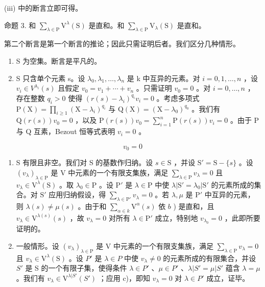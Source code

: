 (iii) 中的断言立即可得。

命题 3. 和 \(\sum_{\lambda \in \mathrm{P}}\mathrm{V}^{\lambda}(\mathrm{S})\) 是直和。和 \(\sum_{\lambda \in \mathrm{P}}\mathrm{V}_{\lambda}(\mathrm{S})\) 是直和。

第二个断言是第一个断言的推论；因此只需证明后者。我们区分几种情形。

\begin{enumerate}
\def\labelenumi{\alph{enumi})}
\item
  S 为空集。断言是平凡的。
\item
  S 只含单个元素 s。设 \(\lambda_{0}, \lambda_{1}, \ldots, \lambda_{n}\) 是 k 中互异的元素。对 \(i = 0, 1, \ldots, n\) ，设 \(v_{i} \in V^{\lambda_{i}}(s)\) 且假定 \(v_{0} = v_{1} + \cdots + v_{n}\) 。只需证明 \(v_{0} = 0\) 。对 \(i = 0, \ldots, n\) ，存在整数 \(q_{i} > 0\) 使得 \((r(s) - \lambda_{i})^{q_{i}} v_{i} = 0\) 。考虑多项式 \(\mathrm{P}(\mathrm{X}) = \prod_{i \geq 1} (\mathrm{X} - \lambda_{i})^{q_{i}}\) 与 \(\mathrm{Q}(\mathrm{X}) = (\mathrm{X} - \lambda_{0})^{q_{0}}\) 。我们有 \(\mathrm{Q}(r(s)) v_{0} = 0\) ，以及 \(\mathrm{P}(r(s)) v_{0} = \sum_{i=1}^{n} \mathrm{P}(r(s)) v_{i} = 0\) 。由于 P 与 Q 互素，Bezout 恒等式表明 \(v_{i} = 0\) 。
\end{enumerate}

\[
v _ {0} = 0
\]

\begin{enumerate}
\def\labelenumi{\alph{enumi})}
\setcounter{enumi}{2}
\item
  S 有限且非空。我们对 S 的基数作归纳。设 \(s \in \mathrm{S}\) ，并设 \(\mathrm{S}' = \mathrm{S} - \{s\}\) 。设 \((v_{\lambda})_{\lambda \in \mathrm{P}}\) 是 V 中元素的一个有限支集族，满足 \(\sum_{\lambda \in \mathrm{P}} v_{\lambda} = 0\) 且 \(v_{\lambda} \in \mathrm{V}^{\lambda}(\mathrm{S})\) 。取 \(\lambda_0 \in \mathrm{P}\) 。设 \(\mathrm{P}'\) 是 \(\lambda \in \mathrm{P}\) 中使 \(\lambda |\mathrm{S}' = \lambda_0|\mathrm{S}'\) 的元素所成的集合。对 \(\mathrm{S}'\) 应用归纳假设，得 \(\sum_{\lambda \in \mathrm{P}'} v_{\lambda} = 0\) 。若 \(\lambda, \mu\) 是 \(\mathrm{P}'\) 中互异的元素，则 \(\lambda(s) \neq \mu(s)\) 。由于和 \(\sum_{\alpha \in k} \mathrm{V}^{\alpha}(s)\) 依 \(b\) ) 是直和，且 \(v_{\lambda} \in \mathrm{V}^{\lambda(s)}(s)\) ，故 \(v_{\lambda} = 0\) 对所有 \(\lambda \in \mathrm{P}'\) 成立，特别地 \(v_{\lambda_0} = 0\) ，此即所要证明的。
\item
  一般情形。设 \((v_{\lambda})_{\lambda\in\mathrm{P}}\) 是 V 中元素的一个有限支集族，满足 \(\sum_{\lambda\in\mathrm{P}} v_{\lambda}=0\) 且 \(v_{\lambda}\in\mathrm{V}^{\lambda}(\mathrm{S})\) 。设 \(P'\) 是 \(\lambda\in P\) 中使 \(v_{\lambda}\neq0\) 的元素所成的有限集合，并设 \(S'\) 是 S 的一个有限子集，使得条件 \(\lambda\in P'\) 、\(\mu\in P'\) 、\(\lambda|S'= \mu|S'\) 蕴含 \(\lambda=\mu\) 。我们有 \(v_{\lambda}\in\mathrm{V}^{\lambda|S'}(S')\) ；应用 c)，即知 \(v_{\lambda}=0\) 对 \(\lambda\in P'\) 成立，证毕。
\end{enumerate}

